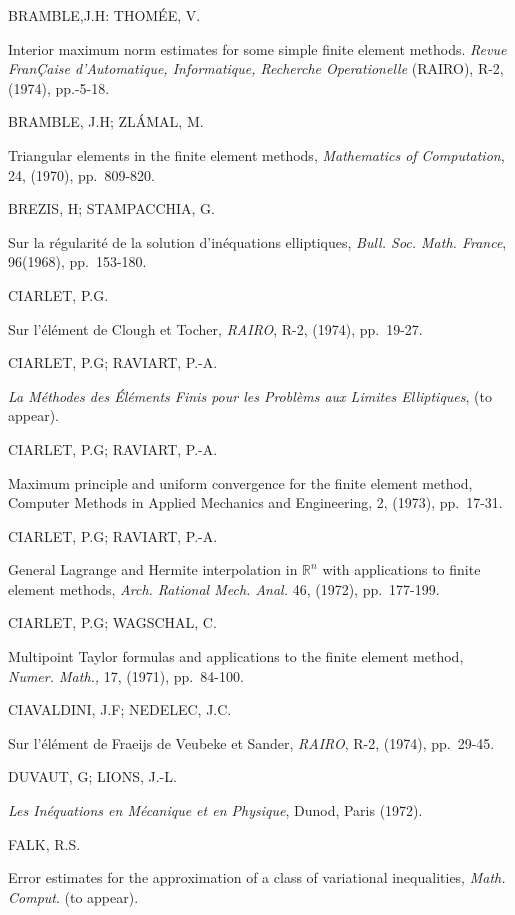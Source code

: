 \begin{thebibliography}{99}
 BRAMBLE,\pageoriginale J.H: THOM\'EE, V.

Interior maximum norm estimates for some simple finite element
methods. {\em Revue Fran\c{C}aise d'Automatique, Informatique,
  Recherche Operationelle} (RAIRO), R-2, (1974), pp.-5-18.

 BRAMBLE, J.H; ZL\'AMAL, M.

Triangular elements in the finite element methods, {\em Mathematics of
  Computation}, 24, (1970), pp.~809-820.

 BREZIS, H; STAMPACCHIA, G.

Sur la r\'egularit\'e de la solution d'in\'equations elliptiques, {\em
  Bull. Soc. Math. France}, 96(1968), pp.~153-180.

 CIARLET, P.G.

Sur l'\'el\'ement de Clough et Tocher, {\em RAIRO}, R-2, (1974),
pp.~19-27. 

 CIARLET, P.G; RAVIART, P.-A.

{\em La M\'ethodes des \'El\'ements Finis pour les Probl\`ems aux
  Limites Elliptiques}, (to appear).

 CIARLET, P.G; RAVIART, P.-A.

Maximum principle and uniform convergence for the finite element
method, Computer Methods in Applied Mechanics and Engineering, 2,
(1973), pp.~17-31.

 CIARLET, P.G; RAVIART, P.-A.

General Lagrange and Hermite interpolation in $\mathbb{R}^{n}$ with
applications to finite element methods, {\em Arch. Rational
  Mech. Anal.} 46, (1972), pp.~177-199.

 CIARLET, P.G; WAGSCHAL, C.

Multipoint Taylor formulas and applications to the finite element
method, {\em Numer. Math.,} 17, (1971), pp.~84-100.

 CIAVALDINI, J.F; NEDELEC, J.C.

Sur l'\'el\'ement de Fraeijs de Veubeke et Sander, {\em RAIRO}, R-2,
(1974), pp.~29-45.

 DUVAUT, G; LIONS, J.-L.

{\em Les In\'equations en M\'ecanique et en Physique}, Dunod, Paris (1972).

 FALK, R.S.

Error estimates for the approximation of a class of variational
inequalities, {\em Math. Comput}. (to appear).


\end{thebibliography}
